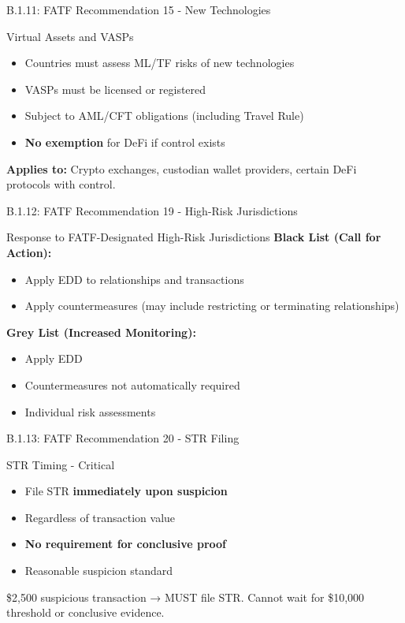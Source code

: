 \documentclass{beamer}
\begin{document}
	\begin{frame}{B.1.11: FATF Recommendation 15 - New Technologies}
		\begin{block}{Virtual Assets and VASPs}
			\begin{itemize}
				\item Countries must assess ML/TF risks of new technologies
				\item VASPs must be licensed or registered
				\item Subject to AML/CFT obligations (including Travel Rule)
				\item \textbf{No exemption} for DeFi if control exists
			\end{itemize}
		\end{block}
		\textbf{Applies to:} Crypto exchanges, custodian wallet providers, certain DeFi protocols with control.
	\end{frame}
	
	\begin{frame}{B.1.12: FATF Recommendation 19 - High-Risk Jurisdictions}
		\begin{block}{Response to FATF-Designated High-Risk Jurisdictions}
			\textbf{Black List (Call for Action):}
			\begin{itemize}
				\item Apply EDD to relationships and transactions
				\item Apply countermeasures (may include restricting or terminating relationships)
			\end{itemize}
			\textbf{Grey List (Increased Monitoring):}
			\begin{itemize}
				\item Apply EDD
				\item Countermeasures not automatically required
				\item Individual risk assessments
			\end{itemize}
		\end{block}
	\end{frame}
	
	\begin{frame}{B.1.13: FATF Recommendation 20 - STR Filing}
		\begin{block}{STR Timing - Critical}
			\begin{itemize}
				\item File STR \textbf{immediately upon suspicion}
				\item Regardless of transaction value
				\item \textbf{No requirement for conclusive proof}
				\item Reasonable suspicion standard
			\end{itemize}
		\end{block}
		\textcolor{red}{\textbf{}} \$2,500 suspicious transaction → MUST file STR. Cannot wait for \$10,000 threshold or conclusive evidence.
	\end{frame}
	
\end{document}
